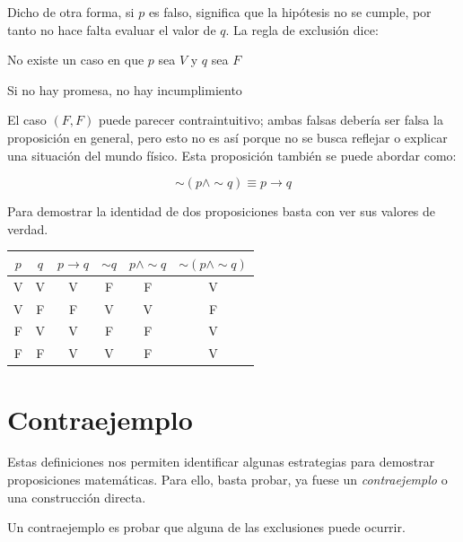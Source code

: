   Dicho de otra forma, si $p$ es falso, significa que la hipótesis no se
  cumple, por tanto no hace falta evaluar el valor de $q$. La regla de
  exclusión dice:

  \alert{No existe un caso en que $p$ sea $V$ y $q$ sea $F$}

  \alert{Si no hay promesa, no hay incumplimiento}

  El caso $(F, F)$ puede parecer contraintuitivo; ambas falsas debería ser
  falsa la proposición en general, pero esto no es así porque no se busca
  reflejar o explicar una situación del mundo físico. Esta proposición
  también se puede abordar como:

  \begin{equation}
  \sim(p \land \sim q) \equiv p \to q
  \end{equation}

  Para demostrar la identidad de dos proposiciones basta con ver sus
  valores de verdad.

  \begin{tabular}{c|c|c|c|c|c}
  $p$ & $q$ & $p \to q$ & $\sim q$ & $p \land \sim q$ & $\sim(p \land \sim q)$ \\
  \hline
  V & V & V & F & F & V \\
  V & F & F & V & V & F \\
  F & V & V & F & F & V \\
  F & F & V & V & F & V \\
  \end{tabular}

  \section{Contraejemplo}

  Estas definiciones nos permiten identificar algunas estrategias para
  demostrar proposiciones matemáticas. Para ello, basta probar, ya fuese
  un \textit{contraejemplo} o una construcción directa.

  \begin{definition}[title={Contraejemplo}]
  Un contraejemplo es probar que alguna de las exclusiones puede ocurrir.
  \end{definition}
